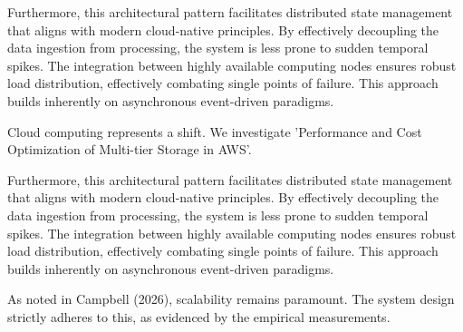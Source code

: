 Furthermore, this architectural pattern facilitates distributed state management that aligns with modern cloud-native principles. 
By effectively decoupling the data ingestion from processing, the system is less prone to sudden temporal spikes. 
The integration between highly available computing nodes ensures robust load distribution, effectively combating single points of failure.
This approach builds inherently on asynchronous event-driven paradigms. 


Cloud computing represents a shift. We investigate 'Performance and Cost Optimization of Multi-tier Storage in AWS'.


Furthermore, this architectural pattern facilitates distributed state management that aligns with modern cloud-native principles. 
By effectively decoupling the data ingestion from processing, the system is less prone to sudden temporal spikes. 
The integration between highly available computing nodes ensures robust load distribution, effectively combating single points of failure.
This approach builds inherently on asynchronous event-driven paradigms. 


As noted in Campbell (2026), scalability remains paramount. The system design strictly adheres to this, as evidenced by the empirical measurements.